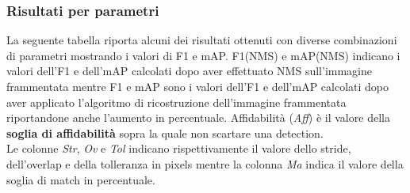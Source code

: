 \clearpage
\subsubsection{Risultati per parametri}
La seguente tabella riporta alcuni dei risultati ottenuti con diverse combinazioni di parametri mostrando i valori di F1 e mAP. F1(NMS) e mAP(NMS) indicano i valori dell'F1 e dell'mAP calcolati dopo aver effettuato NMS sull'immagine frammentata mentre F1 e mAP sono i valori dell'F1 e dell'mAP calcolati dopo aver applicato l'algoritmo di ricostruzione dell'immagine frammentata riportandone anche l'aumento in percentuale. Affidabilità (\textit{Aff}) è il valore della \textbf{soglia di affidabilità} sopra la quale non scartare una detection.\\
Le colonne \textit{Str}, \textit{Ov} e \textit{Tol} indicano rispettivamente il valore dello stride, dell'overlap e della tolleranza in pixels mentre la colonna \textit{Ma} indica il valore della soglia di match in percentuale.


